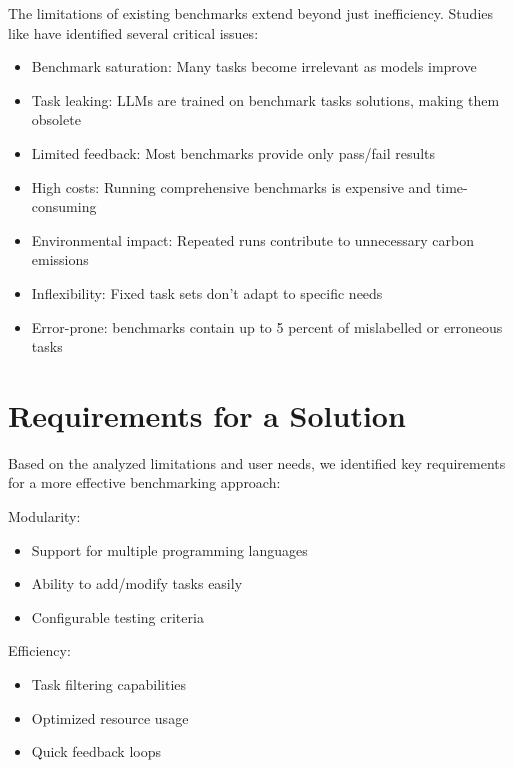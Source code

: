 The limitations of existing benchmarks extend beyond just inefficiency. Studies like  have identified several critical issues:

\begin{itemize}
    \item Benchmark saturation: Many tasks become irrelevant as models improve \cite{vendrow2025largelanguagemodelbenchmarks}
    \item Task leaking: LLMs are trained on benchmark tasks solutions, making them obsolete \cite{vendrow2025largelanguagemodelbenchmarks}
    \item Limited feedback: Most benchmarks provide only pass/fail results
    \item High costs: Running comprehensive benchmarks is expensive and time-consuming
    \item Environmental impact: Repeated runs contribute to unnecessary carbon emissions
    \item Inflexibility: Fixed task sets don't adapt to specific needs
    \item Error-prone: benchmarks contain up to 5 percent of mislabelled or erroneous tasks \cite{vendrow2025largelanguagemodelbenchmarks}
\end{itemize}



\section{Requirements for a Solution}

Based on the analyzed limitations and user needs, we identified key requirements for a more effective benchmarking approach:

Modularity:
\begin{itemize}
    \item Support for multiple programming languages
    \item Ability to add/modify tasks easily
    \item Configurable testing criteria
\end{itemize}

Efficiency:
\begin{itemize}
    \item Task filtering capabilities
    \item Optimized resource usage
    \item Quick feedback loops
\end{itemize}

